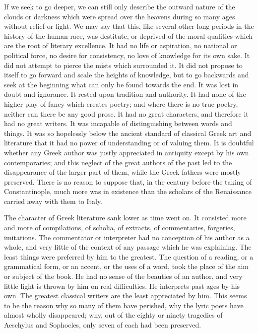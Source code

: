 \documentclass[11pt,letter]{article}
\begin{document}
\par  If we seek to go deeper, we can still only describe the outward nature of the clouds or darkness which were spread over the heavens during so many ages without relief or light. We may say that this, like several other long periods in the history of the human race, was destitute, or deprived of the moral qualities which are the root of literary excellence. It had no life or aspiration, no national or political force, no desire for consistency, no love of knowledge for its own sake. It did not attempt to pierce the mists which surrounded it. It did not propose to itself to go forward and scale the heights of knowledge, but to go backwards and seek at the beginning what can only be found towards the end. It was lost in doubt and ignorance. It rested upon tradition and authority. It had none of the higher play of fancy which creates poetry; and where there is no true poetry, neither can there be any good prose. It had no great characters, and therefore it had no great writers. It was incapable of distinguishing between words and things. It was so hopelessly below the ancient standard of classical Greek art and literature that it had no power of understanding or of valuing them. It is doubtful whether any Greek author was justly appreciated in antiquity except by his own contemporaries; and this neglect of the great authors of the past led to the disappearance of the larger part of them, while the Greek fathers were mostly preserved. There is no reason to suppose that, in the century before the taking of Constantinople, much more was in existence than the scholars of the Renaissance carried away with them to Italy.

\par  The character of Greek literature sank lower as time went on. It consisted more and more of compilations, of scholia, of extracts, of commentaries, forgeries, imitations. The commentator or interpreter had no conception of his author as a whole, and very little of the context of any passage which he was explaining. The least things were preferred by him to the greatest. The question of a reading, or a grammatical form, or an accent, or the uses of a word, took the place of the aim or subject of the book. He had no sense of the beauties of an author, and very little light is thrown by him on real difficulties. He interprets past ages by his own. The greatest classical writers are the least appreciated by him. This seems to be the reason why so many of them have perished, why the lyric poets have almost wholly disappeared; why, out of the eighty or ninety tragedies of Aeschylus and Sophocles, only seven of each had been preserved.
\end{document}
